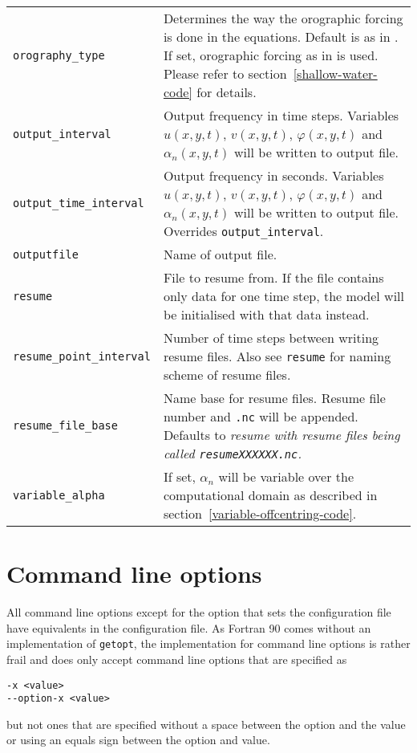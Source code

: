 \documentclass[11pt,a4paper,openright,twoside]{book}
\begin{document}
\begin{tabular}{p{45mm}p{75mm}}
  \texttt{orography\_type} & Determines the way the orographic forcing is done in the equations. Default is as in \cite{Rivest94}. If set, orographic forcing as in \cite{Pedlosky} is used. Please refer to section~\ref{shallow-water-code} for details.\\
  \texttt{output\_interval} & Output frequency in time steps. Variables $u(x,y,t)$, $v(x,y,t)$, $\varphi(x,y,t)$ and $\alpha_n(x,y,t)$ will be written to output file.\\
  \texttt{output\_time\_interval} & Output frequency in seconds. Variables $u(x,y,t)$, $v(x,y,t)$, $\varphi(x,y,t)$ and $\alpha_n(x,y,t)$ will be written to output file. Overrides \texttt{output\_interval}.\\
  \texttt{outputfile} & Name of output file.\\
  \texttt{resume} & File to resume from. If the file contains only data for one time step, the model will be initialised with that data instead.\\
  \texttt{resume\_point\_interval} & Number of time steps between writing resume files. Also see \texttt{resume} for naming scheme of resume files.\\
  \texttt{resume\_file\_base} & Name base for resume files. Resume file number and \texttt{.nc} will be appended. Defaults to \it{resume} with resume files being called \texttt{resumeXXXXXX.nc}.\\ 
  \texttt{variable\_alpha} & If set, $\alpha_n$ will be variable over the computational domain as described in section~\ref{variable-offcentring-code}.
\end{tabular}

\section{Command line options}
All command line options except for the option that sets the configuration file have equivalents in the configuration file. As Fortran 90
comes without an implementation of \texttt{getopt}, the implementation for command line options is rather frail and does only accept
command line options that are specified as

\begin{verbatim}
-x <value>
--option-x <value>
\end{verbatim}

but not ones that are specified without a space between the option and the value or using an equals sign between the option and value.
\end{document}
